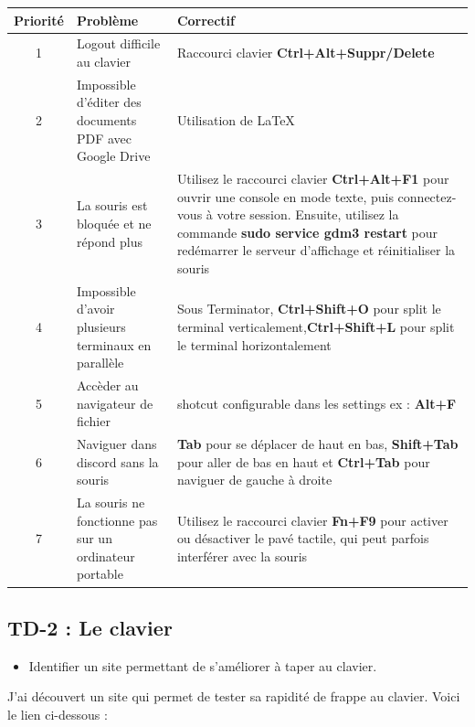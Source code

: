 \documentclass[12pt]{article}
\begin{document}
\begin{tabular}{|c|p{5cm}|p{10cm}|}
  \hline
  \textbf{Priorité} & \textbf{Problème} & \textbf{Correctif}\\
  \hline 
  1 & Logout difficile au clavier & Raccourci clavier \textbf{Ctrl+Alt+Suppr/Delete}\\
  \hline
  2 & Impossible d'éditer des documents PDF avec Google Drive & Utilisation de LaTeX\\
  \hline
  3 & La souris est bloquée et ne répond plus & Utilisez le raccourci clavier \textbf{Ctrl+Alt+F1} pour ouvrir une console en mode texte, puis connectez-vous à votre session. Ensuite, utilisez la commande \textbf{sudo service gdm3 restart} pour redémarrer le serveur d'affichage et réinitialiser la souris \\
  \hline
  4 & Impossible d'avoir plusieurs terminaux en parallèle & Sous Terminator, \textbf{Ctrl+Shift+O} pour split le terminal verticalement,\newline \textbf{Ctrl+Shift+L} pour split le terminal horizontalement\\ 
  \hline
  5 & Accèder au navigateur de fichier & shotcut configurable dans les settings ex : \textbf{Alt+F}\\
  \hline
  6 & Naviguer dans discord sans la souris & \textbf{Tab} pour se déplacer de haut en bas, \textbf{Shift+Tab} pour aller de bas en haut \newline et \textbf{Ctrl+Tab} pour naviguer de gauche à droite\\
  \hline
  7 & La souris ne fonctionne pas sur un ordinateur portable & Utilisez le raccourci clavier \textbf{Fn+F9} pour activer ou désactiver le pavé tactile, qui peut parfois interférer avec la souris \\
  \hline

\end{tabular}

\newpage

  \subsection{TD-2 : Le clavier}

\begin{itemize}
  \item Identifier un site permettant de s'améliorer à taper au clavier.
\end{itemize}

\vspace{0.3cm}

J'ai découvert un site qui permet de tester sa rapidité de frappe au clavier. Voici le lien ci-dessous :
\end{document}
